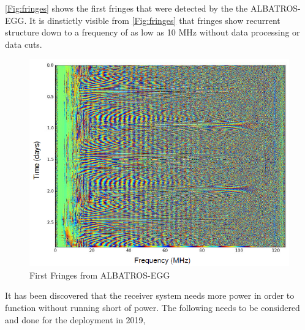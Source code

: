 \documentclass[12pt,a4paper]{report}
\begin{document}
\autoref{Fig:fringes} shows the first fringes that were detected by the the ALBATROS-EGG. It is dinstictly visible from \autoref{Fig:fringes} that fringes show recurrent structure down to a frequency of as low as 10 MHz without data processing or data cuts.

\begin{figure}[ht!]
	\begin{center}
		\includegraphics[width=1\linewidth]{Figures/First-fringes-of-ALBATROS-EGG.PNG}
		\caption{First Fringes from ALBATROS-EGG}
		\label{Fig:fringes}
	\end{center}
\end{figure}



It has been discovered that the receiver system needs more power in order to function without running short of power. The following needs to be considered and done for the deployment in 2019,
\end{document}
